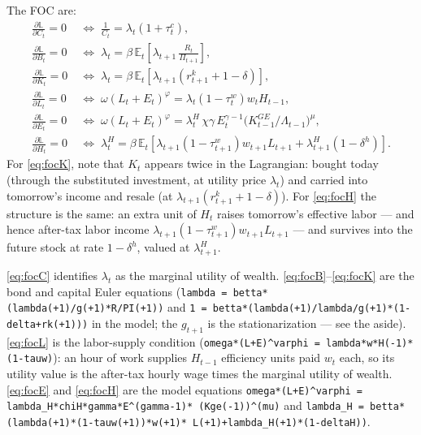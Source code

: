 \documentclass[11pt]{article}
\begin{document}
The FOC are:
\begin{align}
    \frac{\partial\mathbb{L}}{\partial C_t} = 0
    &\;\Leftrightarrow\;
    \frac{1}{C_t} = \lambda_t \left(1+\tau_t^{c}\right), \label{eq:focC}\\
    \frac{\partial\mathbb{L}}{\partial B_t} = 0
    &\;\Leftrightarrow\;
    \lambda_t = \beta\,\mathbb{E}_t\!\left[\lambda_{t+1}\,
    \frac{R_t}{\Pi_{t+1}}\right], \label{eq:focB}\\
    \frac{\partial\mathbb{L}}{\partial K_t} = 0
    &\;\Leftrightarrow\;
    \lambda_t = \beta\,\mathbb{E}_t\!\left[\lambda_{t+1}
    \left(r_{t+1}^{k} + 1 - \delta\right)\right], \label{eq:focK}\\
    \frac{\partial\mathbb{L}}{\partial L_t} = 0
    &\;\Leftrightarrow\;
    \omega\left(L_t + E_t\right)^{\varphi}
    = \lambda_t \left(1-\tau_t^{w}\right) w_t H_{t-1}, \label{eq:focL}\\
    \frac{\partial\mathbb{L}}{\partial E_t} = 0
    &\;\Leftrightarrow\;
    \omega\left(L_t + E_t\right)^{\varphi}
    = \lambda_t^{H}\, \chi\gamma\, E_t^{\gamma-1}
    \big(K_{t-1}^{GE}/\Lambda_{t-1}\big)^{\mu}, \label{eq:focE}\\
    \frac{\partial\mathbb{L}}{\partial H_t} = 0
    &\;\Leftrightarrow\;
    \lambda_t^{H} = \beta\,\mathbb{E}_t\!\left[\lambda_{t+1}
    \left(1-\tau_{t+1}^{w}\right) w_{t+1} L_{t+1}
    + \lambda_{t+1}^{H}\left(1-\delta^{h}\right)\right]. \label{eq:focH}
\end{align}
For \eqref{eq:focK}, note that $K_t$ appears twice in the Lagrangian: bought today
(through the substituted investment, at utility price $\lambda_t$) and carried
into tomorrow's income and resale (at $\lambda_{t+1}(r^k_{t+1}+1-\delta)$). For
\eqref{eq:focH} the structure is the same: an extra unit of $H_t$ raises
tomorrow's effective labor --- and hence after-tax labor income
$\lambda_{t+1}(1-\tau^w_{t+1})w_{t+1}L_{t+1}$ --- and survives into the future
stock at rate $1-\delta^{h}$, valued at $\lambda^{H}_{t+1}$.

\eqref{eq:focC} identifies $\lambda_t$ as the marginal utility of wealth.
\eqref{eq:focB}--\eqref{eq:focK} are the bond and capital Euler equations
(\texttt{lambda = betta*(lambda(+1)/g(+1)*R/PI(+1))} and
\texttt{1 = betta*(lambda(+1)/lambda/g(+1)*(1-delta+rk(+1)))} in the model; the
$g_{t+1}$ is the stationarization --- see the aside). \eqref{eq:focL} is the
labor-supply condition (\texttt{omega*(L+E)\^{}varphi = lambda*w*H(-1)*(1-tauw)}):
an hour of work supplies $H_{t-1}$ efficiency units paid $w_t$ each, so its
utility value is the after-tax hourly wage times the marginal utility of wealth.
\eqref{eq:focE} and \eqref{eq:focH} are the model equations
\texttt{omega*(L+E)\^{}varphi = lambda\_H*chiH*gamma*E\^{}(gamma-1)*
(Kge(-1))\^{}(mu)} and \texttt{lambda\_H = betta*(lambda(+1)*(1-tauw(+1))*w(+1)*
L(+1)+lambda\_H(+1)*(1-deltaH))}.
\end{document}
